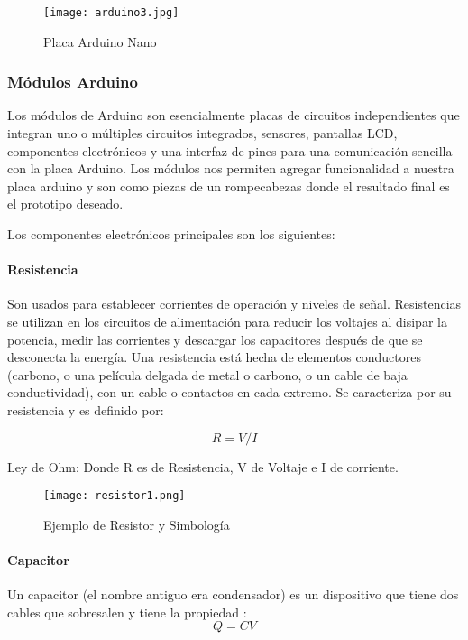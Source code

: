 \begin{figure}[H]
	\centering
	\texttt{[image: arduino3.jpg]}
	\caption{Placa Arduino Nano}
\end{figure}

\subsubsection{Módulos Arduino}

\par
Los módulos de Arduino son esencialmente placas de circuitos independientes que integran uno o múltiples circuitos integrados, sensores, pantallas LCD, componentes electrónicos y una interfaz de pines para una comunicación sencilla con la placa Arduino. Los módulos nos permiten agregar funcionalidad a nuestra placa arduino y son como piezas de un rompecabezas donde el resultado final es el prototipo deseado.

\par \noindent
Los componentes electrónicos principales son los siguientes:

\paragraph{Resistencia}
Son usados para establecer corrientes de operación y niveles de señal. Resistencias se utilizan en los circuitos de alimentación para reducir los voltajes al disipar la potencia, medir las corrientes y descargar los capacitores después de que se desconecta la energía. Una resistencia está hecha de elementos conductores (carbono, o una película delgada de metal o carbono, o un cable de baja conductividad), con un cable o contactos en cada extremo\cite{artofelectronics}. Se caracteriza por su resistencia y es definido por:

$$R = V/I$$

\begin{nscenter}
	Ley de Ohm: Donde R es de Resistencia, V de Voltaje e I de corriente.
\end{nscenter}

\begin{figure}[H]
	\centering
	\texttt{[image: resistor1.png]}
	\caption{Ejemplo de Resistor y Simbología}
\end{figure}

\paragraph{Capacitor }
Un capacitor (el nombre antiguo era
condensador) es un dispositivo que tiene dos cables que sobresalen y tiene la propiedad\cite{artofelectronics} :
$$Q = CV$$ 

